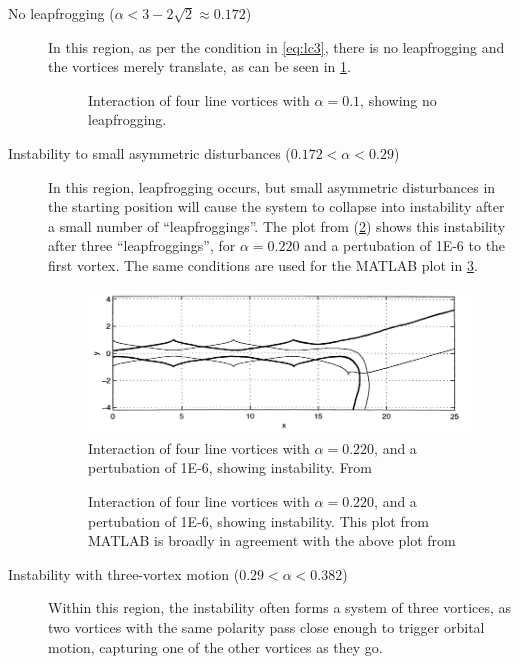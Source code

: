 \documentclass[10pt, a4paper]{article}
\numberwithin{equation}{section}
\begin{document}
\begin{description}
\item[No leapfrogging ($\alpha<3-2\sqrt{2}\approx
0.172$)]
In this region, as per the condition in \cref{eq:lc3}, there is no leapfrogging and the vortices merely translate, as can be seen in \cref{fig:noleap}.
\begin{figure}[ht]
\centering
\setlength\figureheight{7.5cm} 
\setlength\figurewidth{\textwidth}

\caption{Interaction of four line vortices with $\alpha=0.1$, showing no leapfrogging.}
\label{fig:noleap}
\end{figure}
\item[Instability to small asymmetric disturbances ($0.172<\alpha<0.29$)] 
In this region, leapfrogging occurs, but small asymmetric disturbances in the starting position will cause the system to collapse into instability after a small number of ``leapfroggings''.
The plot from \citet{acheson00} (\cref{fig:achinst}) shows this instability after three ``leapfroggings'', for $\alpha=0.220$ and a pertubation of \num{1E-6} to the first vortex.
The same conditions are used for the MATLAB plot in \cref{fig:instab}.
\begin{figure}[ht]
\centering
\includegraphics[width=\textwidth]{achinst.png}
\caption{Interaction of four line vortices with $\alpha=0.220$, and a pertubation of \num{1E-6}, showing instability. From \citet[p.~271]{acheson00}}
\label{fig:achinst}
\end{figure}
\begin{figure}[ht]
\centering
\setlength\figureheight{7.5cm} 
\setlength\figurewidth{\textwidth}

\caption{Interaction of four line vortices with $\alpha=0.220$, and a pertubation of \num{1E-6},  showing instability. This plot from MATLAB is broadly in agreement with the above plot from \citet{acheson00}}
\label{fig:instab}
\end{figure}
\item[Instability with three-vortex motion ($0.29<\alpha<0.382$)]
Within this region, the instability often forms a system of three vortices, as two vortices with the same polarity pass close enough to trigger orbital motion, capturing one of the other vortices as they go.

\end{description}
\end{document}
